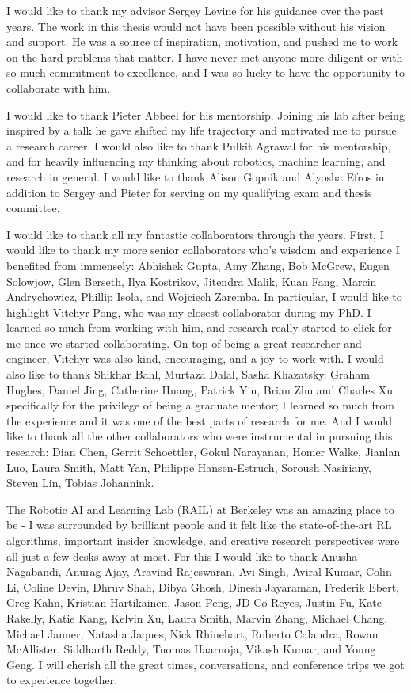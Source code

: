 I would like to thank my advisor Sergey Levine for his guidance over the past years.
The work in this thesis would not have been possible without his vision and support.
He was a source of inspiration, motivation, and pushed me to work on the hard problems that matter.
I have never met anyone more diligent or with so much commitment to excellence, and I was so lucky to have the opportunity to collaborate with him.

I would like to thank Pieter Abbeel for his mentorship.
Joining his lab after being inspired by a talk he gave shifted my life trajectory and motivated me to pursue a research career.
I would also like to thank Pulkit Agrawal for his mentorship, and for heavily influencing my thinking about robotics, machine learning, and research in general. I would like to thank Alison Gopnik and Alyosha Efros in addition to Sergey and Pieter for serving on my qualifying exam and thesis committee.

\vspace{5mm}

I would like to thank all my fantastic collaborators through the years.
First, I would like to thank my more senior collaborators who's wisdom and experience I benefited from immensely: Abhishek Gupta, Amy Zhang, Bob McGrew, Eugen Solowjow, Glen Berseth, Ilya Kostrikov, Jitendra Malik, Kuan Fang, Marcin Andrychowicz, Phillip Isola, and Wojciech Zaremba.
In particular, I would like to highlight Vitchyr Pong, who was my closest collaborator during my PhD.
I learned so much from working with him, and research really started to click for me once we started collaborating.
On top of being a great researcher and engineer, Vitchyr was also kind, encouraging, and a joy to work with.
I would also like to thank Shikhar Bahl, Murtaza Dalal, Sasha Khazatsky, Graham Hughes, Daniel Jing, Catherine Huang, Patrick Yin, Brian Zhu and Charles Xu specifically for the privilege of being a graduate mentor; I learned so much from the experience and it was one of the best parts of research for me.
And I would like to thank all the other collaborators who were instrumental in pursuing this research: Dian Chen, Gerrit Schoettler, Gokul Narayanan, Homer Walke, Jianlan Luo, Laura Smith, Matt Yan, Philippe Hansen-Estruch, Soroush Nasiriany, Steven Lin, Tobias Johannink.

The Robotic AI and Learning Lab (RAIL) at Berkeley was an amazing place to be - I was surrounded by brilliant people and it felt like the state-of-the-art RL algorithms, important insider knowledge, and creative research perspectives were all just a few desks away at most.
For this I would like to thank Anusha Nagabandi, Anurag Ajay, Aravind Rajeswaran, Avi Singh, Aviral Kumar, Colin Li, Coline Devin, Dhruv Shah, Dibya Ghosh, Dinesh Jayaraman, Frederik Ebert, Greg Kahn, Kristian Hartikainen, Jason Peng, JD Co-Reyes, Justin Fu, Kate Rakelly, Katie Kang, Kelvin Xu, Laura Smith, Marvin Zhang, Michael Chang, Michael Janner, Natasha Jaques, Nick Rhinehart, Roberto Calandra, Rowan McAllister, Siddharth Reddy, Tuomas Haarnoja, Vikash Kumar, and Young Geng.
I will cherish all the great times, conversations, and conference trips we got to experience together.

